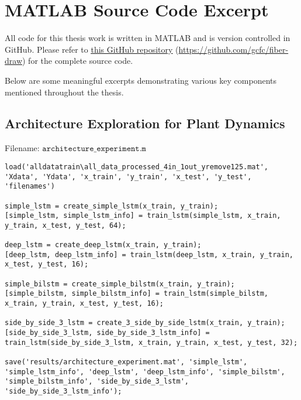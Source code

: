
%


\chapter{MATLAB Source Code Excerpt} \label{apdx:code}

All code for this thesis work is written in MATLAB and is version controlled in GitHub. Please refer to \href{https://github.com/gcfc/fiber-draw}{\underline{this GitHub repository}} (\href{https://github.com/gcfc/fiber-draw}{https://github.com/gcfc/fiber-draw}) for the complete source code. 

Below are some meaningful excerpts demonstrating various key components mentioned throughout the thesis. 

\section{Architecture Exploration for Plant Dynamics}

Filename: $\texttt{architecture\_experiment.m}$
\begin{lstlisting}
load('alldatatrain\all_data_processed_4in_1out_yremove125.mat', 'Xdata', 'Ydata', 'x_train', 'y_train', 'x_test', 'y_test', 'filenames')   

simple_lstm = create_simple_lstm(x_train, y_train);
[simple_lstm, simple_lstm_info] = train_lstm(simple_lstm, x_train, y_train, x_test, y_test, 64);

deep_lstm = create_deep_lstm(x_train, y_train);
[deep_lstm, deep_lstm_info] = train_lstm(deep_lstm, x_train, y_train, x_test, y_test, 16);

simple_bilstm = create_simple_bilstm(x_train, y_train);
[simple_bilstm, simple_bilstm_info] = train_lstm(simple_bilstm, x_train, y_train, x_test, y_test, 16);

side_by_side_3_lstm = create_3_side_by_side_lstm(x_train, y_train);
[side_by_side_3_lstm, side_by_side_3_lstm_info] = train_lstm(side_by_side_3_lstm, x_train, y_train, x_test, y_test, 32);

save('results/architecture_experiment.mat', 'simple_lstm', 'simple_lstm_info', 'deep_lstm', 'deep_lstm_info', 'simple_bilstm', 'simple_bilstm_info', 'side_by_side_3_lstm', 'side_by_side_3_lstm_info');
\end{lstlisting}

